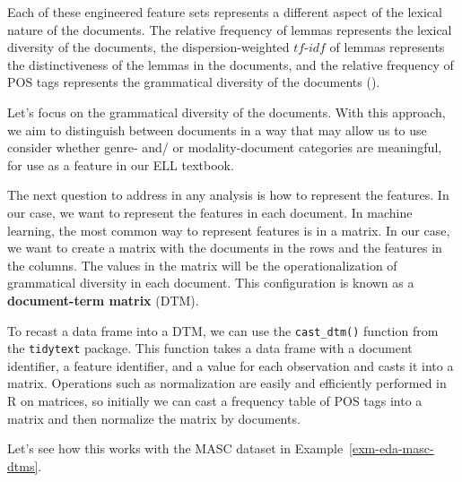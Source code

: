 \documentclass[
  letterpaper,
  DIV=11,
  numbers=noendperiod]{scrreprt}
\theoremstyle{definition}
\theoremstyle{remark}
\begin{document}
Each of these engineered feature sets represents a different aspect of
the lexical nature of the documents. The relative frequency of lemmas
represents the lexical diversity of the documents, the
dispersion-weighted \(tf\)-\(idf\) of lemmas represents the
distinctiveness of the lemmas in the documents, and the relative
frequency of POS tags represents the grammatical diversity of the
documents ().

Let's focus on the grammatical diversity of the documents. With this
approach, we aim to distinguish between documents in a way that may
allow us to use consider whether genre- and/ or modality-document
categories are meaningful, for use as a feature in our ELL textbook.

The next question to address in any analysis is how to represent the
features. In our case, we want to represent the features in each
document. In machine learning, the most common way to represent features
is in a matrix. In our case, we want to create a matrix with the
documents in the rows and the features in the columns. The values in the
matrix will be the operationalization of grammatical diversity in each
document. This configuration is known as a \textbf{document-term matrix}
(DTM).

To recast a data frame into a DTM, we can use the \texttt{cast\_dtm()}
function from the \texttt{tidytext} package. This function takes a data
frame with a document identifier, a feature identifier, and a value for
each observation and casts it into a matrix. Operations such as
normalization are easily and efficiently performed in R on matrices, so
initially we can cast a frequency table of POS tags into a matrix and
then normalize the matrix by documents.

Let's see how this works with the MASC dataset in
Example~\ref{exm-eda-masc-dtms}.
\end{document}
